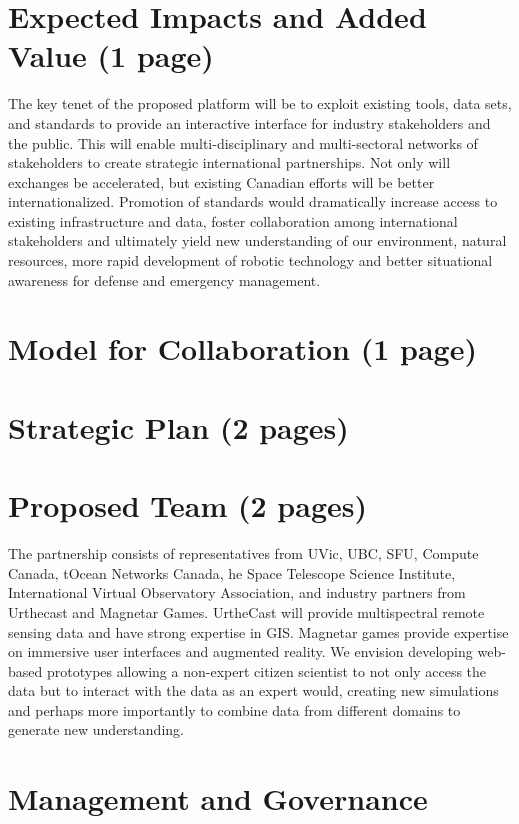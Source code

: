 \documentclass[pdftex,12pt]{article}
\begin{document}
\section{Expected Impacts and Added Value  (1 page)}

The key tenet of the proposed platform will be to exploit existing
tools, data sets, and standards to provide an interactive interface
for industry stakeholders and the public.  This will enable
multi-disciplinary and multi-sectoral networks of stakeholders to
create strategic international partnerships. Not only will exchanges
be accelerated, but existing Canadian efforts will be better
internationalized.  Promotion of standards would dramatically increase
access to existing infrastructure and data, foster collaboration among
international stakeholders and ultimately yield new understanding of
our environment, natural resources, more rapid development of robotic
technology and better situational awareness for defense and emergency
management.

\section{Model for Collaboration (1 page)}

\section{Strategic Plan (2 pages)}
\section{Proposed Team (2 pages)}

The partnership consists of representatives from UVic, UBC, SFU,
Compute Canada, tOcean Networks Canada, he Space Telescope Science
Institute, International Virtual Observatory Association, and industry
partners from Urthecast and Magnetar Games.  UrtheCast will provide
multispectral remote sensing data and have strong expertise in GIS.
Magnetar games provide expertise on immersive user interfaces and
augmented reality.  We envision developing web-based prototypes
allowing a non-expert citizen scientist to not only access the data
but to interact with the data as an expert would, creating new
simulations and perhaps more importantly to combine data from
different domains to generate new understanding.

\section{ Management and Governance }
\end{document}
